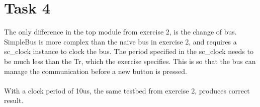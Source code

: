 \documentclass[11pt]{report}
\begin{document}
\section*{Task 4}
The only difference in the top module from exercise 2, is the change of bus.
SimpleBus is more complex than the naive bus in exercise 2, and requires a
sc\_clock instance to clock the bus. The period specified in the sc\_clock needs
to be much less than the Tr, which the exercise specifies. This is so that the
bus can manage the communication before a new button is pressed.\\
\\With a clock period of 10us, the same testbed from exercise 2, produces
correct result. 
\end{document}
